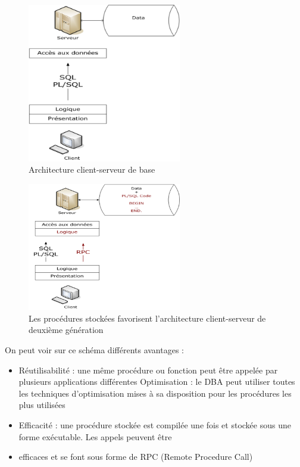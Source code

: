 \documentclass[10pt]{beamer}
\begin{document}
\begin{frame}{\secname}
    \begin{figure}
        \begin{center}
            \includegraphics[width=0.6\textwidth]{../assets/img/client_serveur.png}
            \caption{Architecture client-serveur de base}
        \end{center}
    \end{figure}
\end{frame}

\begin{frame}[allowframebreaks]{\secname}
    \begin{figure}
        \begin{center}
            \includegraphics[width=0.6\textwidth]{../assets/img/client_serveur2.png}
            \caption{Les procédures stockées favorisent l'architecture client-serveur de deuxième génération}
        \end{center}
    \end{figure}
    On peut voir sur ce schéma différents avantages :
    \begin{itemize}
        \item  Réutilisabilité : une même procédure ou fonction peut être appelée par plusieurs applications différentes
              Optimisation : le DBA peut utiliser toutes les techniques d'optimisation mises à sa disposition pour les procédures les plus utilisées
        \item Efficacité : une procédure stockée est compilée une fois et stockée sous une forme exécutable.  Les appels peuvent être
        \item efficaces et se font sous forme de RPC (Remote Procedure Call)
    \end{itemize}
\end{frame}
\end{document}
